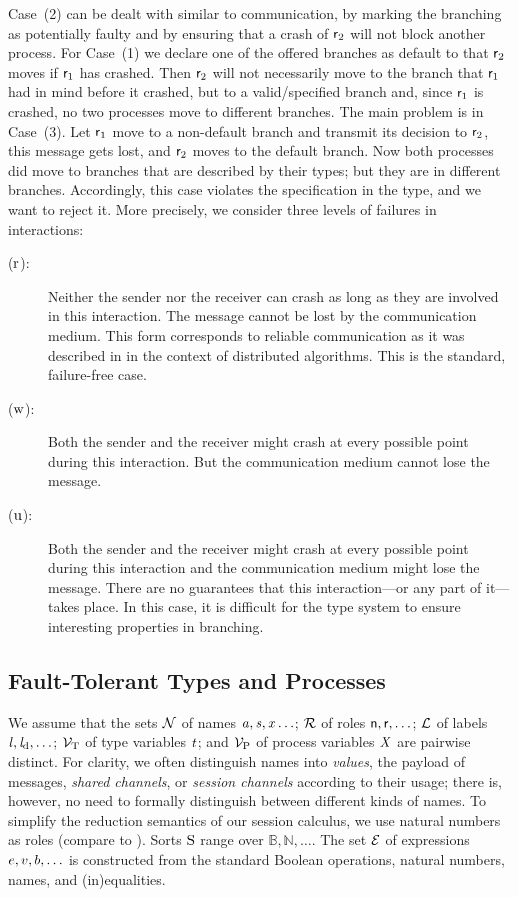 Case~(2) can be dealt with similar to \unrel communication, \ie by marking the branching as potentially faulty and by ensuring that a crash of $ \Role_2 $ will not block another process.
For Case~(1) we declare one of the offered branches as default to that $ \Role_2 $ moves if $ \Role_1 $ has crashed.
Then $ \Role_2 $ will not necessarily move to the branch that $ \Role_1 $ had in mind before it crashed, but to a valid/specified branch and, since $ \Role_1 $ is crashed, no two processes move to different branches.
The main problem is in Case~(3).
Let $ \Role_1 $ move to a non-default branch and transmit its decision to $ \Role_2 $, this message gets lost, and $ \Role_2 $ moves to the default branch.
Now both processes did move to branches that are described by their types; but they are in different branches.
Accordingly, this case violates the specification in the type, and we want to reject it.
More precisely, we consider three levels of failures in interactions:
\begin{description}
	\item[\StrongR ($ \iR $):] Neither the sender nor the receiver can crash as long as they are involved in this interaction. The message cannot be lost by the communication medium. This form corresponds to reliable communication as it was described in \cite{AguileraChenToueg97} in the context of distributed algorithms.
		This is the standard, failure-free case.
	\item[\WeakR ($ \iW $):] Both the sender and the receiver might crash at every possible point during this interaction. But the communication medium cannot lose the message.
	\item[\Unrel ($ \iU $):] Both the sender and the receiver might crash at every possible point during this interaction and the communication medium might lose the message. There are no guarantees that this interaction---or any part of it---takes place.
		In this case, it is difficult for the type system to ensure interesting properties in branching.
\end{description}

\subsection{Fault-Tolerant Types and Processes}
\label{sec:syntax}

We assume that the sets $ \names $ of names $ \Chan[a], \Chan, \Args \ldots $; $ \roles $ of roles $ \Role[n], \Role, \ldots $; $ \labels $ of labels $ \Label, \LabelD, \ldots $; $ \typeVars $ of type variables $ \TypeV $; and $ \procVars $ of process variables $ \ProcV $ are pairwise distinct.
For clarity, we often distinguish names into \emph{values}, \ie the payload of messages, \emph{shared channels}, or \emph{session channels} according to their usage; there is, however, no need to formally distinguish between different kinds of names.
To simplify the reduction semantics of our session calculus, we use natural numbers as roles (compare to \cite{hondaYoshidaCarbone16}).
Sorts $ \Sort $ range over $ \mathbb{B}, \mathbb{N}, \ldots $.
The set $ \expressions $ of expressions $ \Expr, \Expr[v], \Expr[b], \ldots $ is constructed from the standard Boolean operations, natural numbers, names, and (in)equalities.

